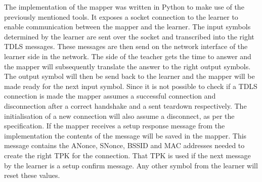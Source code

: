 The implementation of the mapper was written in Python to make use of the previously mentioned tools. It exposes a socket connection to the learner to enable communication between the mapper and the learner. The input symbols determined by the learner are sent over the socket and transcribed into the right TDLS messages. These messages are then send on the network interface of the learner side in the network.
The side of the teacher gets the time to answer and the mapper will subsequently translate the answer to the right output symbols. The output symbol will then be send back to the learner and the mapper will be made ready for the next input symbol. Since it is not possible to check if a TDLS connection is made the mapper assumes a successful connection and disconnection after a correct handshake and a sent teardown respectively. The initialisation of a new connection will also assume a disconnect, as per the specification. If the mapper receives a setup response message from the implementation the contents of the message will be saved in the mapper. This message contains the ANonce, SNonce, BSSID and MAC addresses needed to create the right TPK for the connection. That TPK is used if the next message by the learner is a setup confirm message. Any other symbol from the learner will reset these values.